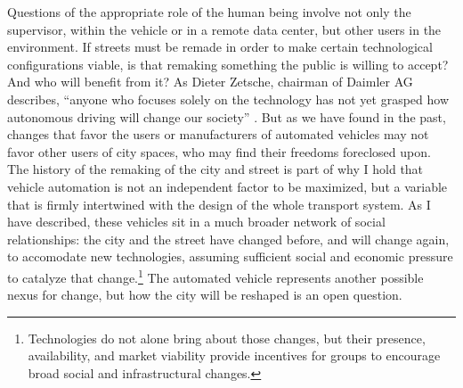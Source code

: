 Questions of the appropriate role of the human being involve not
only the supervisor, within the vehicle or in a remote data center,
but other users in the environment. If streets must be remade in
order to make certain technological configurations viable, is that
remaking something the public is willing to accept? And who will
benefit from it? As Dieter Zetsche, chairman of Daimler AG describes,
``anyone who focuses solely on the technology has not yet grasped how 
autonomous driving will change our
society'' \cite{slashgearDavies}.
But as we have found in the past, changes that favor the users or
manufacturers of automated vehicles may not favor other users of city
spaces, who may find their freedoms foreclosed upon. The history of
the remaking of the city and street is part of why I hold that
vehicle automation is not an 
independent factor to be maximized, but a variable that is firmly
intertwined with the design of the whole transport system.
As I have described, these vehicles sit in a much broader network of
social relationships: the city and the street have changed before, and
will change again, to accomodate new technologies, assuming sufficient
social and economic pressure to catalyze that change.\footnote{Technologies do
not alone bring about those changes, but their presence, availability,
and market viability provide incentives for groups to encourage broad
social and infrastructural changes.} The automated vehicle represents
another possible nexus for change, but how the city will be reshaped
is an open question. 

